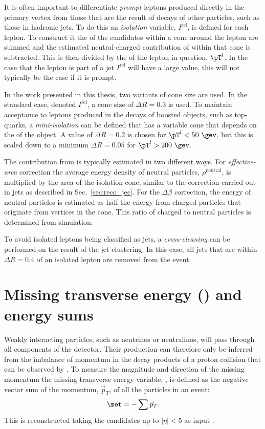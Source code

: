 It is often important to differentiate \emph{prompt} leptons produced
directly in the primary vertex from those that are the result of decays
of other particles, such as those in hadronic jets. To do this an
\emph{isolation} variable, $I^{\textrm{rel}}$, is defined for each
lepton. To construct it the \pT of the \PF candidates within a cone
around the lepton are summed and the estimated neutral-charged
contribution of \PU within that cone is subtracted. This is then
divided by the \pT of the lepton in question, $\pT^l$. In the case
that the lepton is part of a jet $I^{\textrm{rel}}$ will have a large
value, this will not typically be the case if it is prompt.

In the work presented in this thesis, two variants of cone size are
used. In the standard case, denoted $I^{\textrm{rel}}$, a cone size
of $\Delta R=0.3$ is used. To maintain acceptance to leptons produced
in the decays of boosted objects, such as top-quarks, a
\emph{mini-isolation} can be defined that has a variable cone that
depends on the \pT of the object. A value of $\Delta R=0.2$ is chosen
for $\pT^l<50~\gev$, but this is scaled down to a minimum $\Delta
R=0.05$ for $\pT^l>200~\gev$.

The contribution from \PU is typically estimated in two different
ways. For \emph{effective-area} correction the average \PU energy
density of neutral particles, $\rho^{\textrm{neutral}}$, is multiplied
by the area of the isolation cone, similar to the \PU correction
carried out in jets as described in Sec.~\ref{sec:reco_jec}. For the
\emph{$\Delta\beta$} correction, the energy of neutral particles is
estimated as half the energy from charged particles that originate
from \PU vertices in the cone. This ratio of charged to neutral
particles is determined from simulation. %

To avoid isolated leptons being classified as jets, a
\emph{cross-cleaning} can be performed on the result of the jet clustering.
In this case, all jets that are within $\Delta R=0.4$ of an isolated
lepton are removed from the event.

\section{Missing transverse energy (\met) and energy sums}
\label{sec:met_reco}

Weakly interacting particles, such as neutrinos or neutralinos, will
pass through all components of the \CMS detector. Their production can
therefore only be inferred from the imbalance of momentum in the decay
products of a proton collision that can be observed by \CMS. To
measure the magnitude and direction of the missing momentum the
missing transverse energy variable, \met, is defined as the negative
vector sum of the momentum, $\vec{p}_T$, of all the particles in an
event:
\begin{equation}
\met = -\sum{\vec{p}_T}.
\end{equation}
This is reconstructed taking the \PF candidates up to $|\eta|<5$ as
input \cite{1748-0221-10-02-P02006}. 

